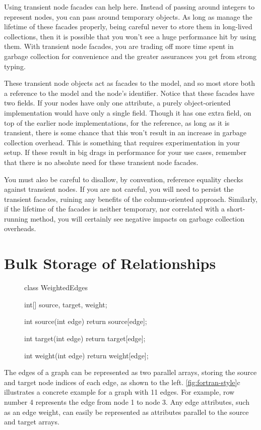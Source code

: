 Using transient node facades can help here. Instead of passing around integers
to represent nodes, you can pass around temporary  objects. As long
as manage the lifetime of these facades properly, being careful never to store
them in long-lived collections, then it is possible that you won't see a huge
performance hit by using them. With transient node facades, you are trading off
more time spent in garbage collection for convenience and the greater assurances
you get from strong typing. 

These transient node objects act as facades to the  model, and so
most store both a reference to the  model and the node's
identifier. Notice that these facades have two fields. If your nodes have only
one attribute, a purely object-oriented implementation would have only a single
field. Though it has one extra field, on top of the earlier node
implementations, for the  reference, as long as it is transient,
there is some chance that this won't result in an increase in garbage collection
overhead. This is something that requires experimentation in your setup. If
these result in big drags in performance for your use cases, remember that there
is no absolute need for these transient node facades.

You must also be careful to disallow, by convention, reference equality
checks against transient nodes. If you are not careful, you will need to persist
the transient facades, ruining any benefits of the column-oriented approach.
Similarly, if the lifetime of the facades is neither temporary, nor correlated
with a short-running method, you will certainly see negative impacts on garbage
collection overheads.

\section{Bulk Storage of Relationships}
\label{sec:bulk-storage-of-relationships}

\begin{figure}
\centering
\vspace{-3mm}
\begin{framedlisting}
class WeightedEdges {
  int[] source, target, weight;
  
  int source(int edge) {
    return source[edge];
  }
  
  int target(int edge) {
    return target[edge];
  }
  
  int weight(int edge) {
    return weight[edge];
  }
}
\end{framedlisting}
\end{figure}The edges of a graph can be represented as two parallel arrays, storing the
source and target node indices of each edge, as shown to the left.  
\autoref{fig:fortran-style}c illustrates a concrete example for a graph with 11
edges. For example, row number 4 represents the edge from node 1
to node 3. Any edge attributes, such as an edge weight, can easily be
represented as attributes parallel to the source and target arrays. 

